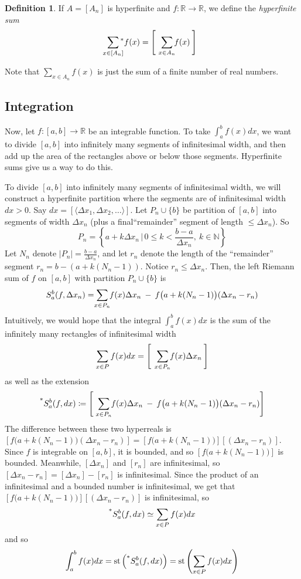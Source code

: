 \documentclass{article}
\newcommand{\sthat}{\,|\,}
\newcommand{\reals}{\mathbb{R}}
\newcommand{\nats}{\mathbb{N}}
\newcommand{\hr}[1]{\prescript{*}{}{#1}}
\DeclareMathOperator{\st}{st}
\theoremstyle{definition}
\newtheorem*{defn}{Definition}
\begin{document}
\begin{defn}
    If $A = [A_n]$ is hyperfinite and $f: \reals \to \reals$, we define the \textit{hyperfinite sum}
    \[\sum_{\mathclap{x \in [A_n]}} \hr{f}(x) = \left[\ \ \sum_{\mathclap{x \in A_n}} f(x) \:\right]\]
\end{defn}

Note that $\sum_{x \in A_n} f(x)$ is just the sum of a finite number of real numbers.

\subsection{Integration}
Now, let $f: [a, b] \to \reals$ be an integrable function. To take $\int_a^b f(x)dx$, we want to divide $[a, b]$ into infinitely many segments of infinitesimal width, and then add up the area of the rectangles above or below those segments. Hyperfinite sums give us a way to do this.

To divide $[a, b]$ into infinitely many segments of infinitesimal width, we will construct a hyperfinite partition where the segments are of infinitesimal width $dx > 0$. Say $dx = [\langle \Delta x_1, \Delta x_2, \ldots \rangle]$. Let $P_n \cup \{b\}$ be partition of $[a, b]$ into segments of width $\Delta x_n$ (plus a final``remainder'' segment of length $\leq \Delta x_n$). So
\[P_n = \left\{a + k\Delta x_n \sthat 0 \leq k < \frac{b-a}{\Delta x_n},\ k \in \nats\right\}\]
Let $N_n$ denote $|P_n| = \frac{b-a}{\Delta x_n}$, and let $r_n$ denote the length of the ``remainder'' segment $r_n = b - (a + k(N_n-1))$. Notice $r_n \leq \Delta x_n$. Then, the left Riemann sum of $f$ on $[a, b]$ with partition $P_n \cup \{b\}$ is 
\[S_a^b (f, \Delta x_n) = \sum_{\mathclap{x \in P_n}} f(x) \Delta x_n \:-\: f\big(a+k(N_n-1)\big)(\Delta x_n - r_n)\]
Intuitively, we would hope that the integral $\int_a^b f(x)dx$ is the sum of the infinitely many rectangles of infinitesimal width 
\[\sum_{x \in P}f(x)dx = \left[\ \ \sum_{\mathclap{x \in P_n}} f(x)\Delta x_n\:\right]\]
as well as the extension 
\[\hr{S_a^b} (f, dx) \coloneq \left[\ \:\sum_{\mathclap{x \in P_n}} f(x) \Delta x_n \:-\: f\big(a+k(N_n-1)\big)(\Delta x_n - r_n)\right]\]
The difference between these two hyperreals is $[f\big(a+k(N_n-1)\big)(\Delta x_n - r_n)] = [f\big(a+k(N_n-1)\big)][(\Delta x_n - r_n)]$. Since $f$ is integrable on $[a, b]$, it is bounded, and so $[f\big(a+k(N_n-1)\big)]$ is bounded. Meanwhile, $[\Delta x_n]$ and $[r_n]$ are infinitesimal, so $[\Delta x_n - r_n] = [\Delta x_n] - [r_n]$ is infinitesimal. Since the product of an infinitesimal and a bounded number is infinitesimal, we get that $[f\big(a+k(N_n-1)\big)][(\Delta x_n - r_n)]$ is infinitesimal, so
\[\hr{S_a^b} (f, dx) \simeq \sum_{x \in P}f(x)dx\]
and so
\[\int_a^b f(x)dx = \st\left(\hr{S_a^b} (f, dx)\right) = \st\left(\sum_{x \in P}f(x)dx\right)\]
\end{document}
